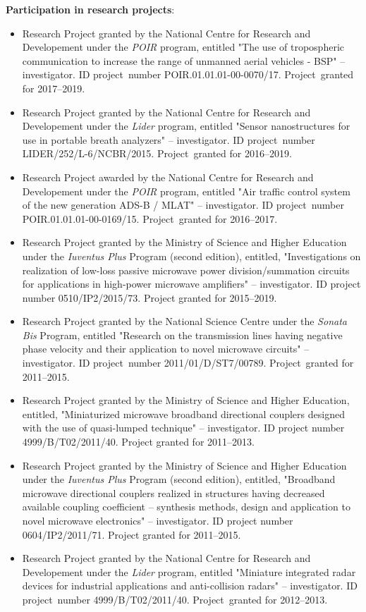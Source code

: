 \noindent \textbf{Participation in research projects}:
\begin{itemize}[nosep]
\item Research Project granted by the National Centre for Research and Developement under the \textit{POIR} program, entitled "The use of tropospheric communication to increase the range of unmanned aerial vehicles - BSP" -- investigator. ID project~number POIR.01.01.01-00-0070/17. Project~granted for 2017--2019.
\item Research Project granted by the National Centre for Research and Developement under the \textit{Lider} program, entitled "Sensor nanostructures for use in portable breath analyzers" -- investigator. ID project~number LIDER/252/L-6/NCBR/2015. Project~granted for 2016--2019.
\item Research Project awarded by the National Centre for Research and Developement under the \textit{POIR} program, entitled "Air traffic control system of the new generation ADS-B / MLAT" -- investigator. ID project~number POIR.01.01.01-00-0169/15. Project~granted for 2016--2017.
\item Research Project granted by the Ministry of Science and Higher Education under the \textit{Iuventus Plus} Program (second edition), entitled, "Investigations on realization of low-loss passive microwave power division/summation circuits for applications in high-power microwave amplifiers" -- investigator. ID project number 0510/IP2/2015/73. Project granted for 2015--2019.
\item Research Project granted by the National Science Centre under the \textit{Sonata Bis} Program, entitled "Research on the transmission lines having negative phase velocity and their application to novel microwave circuits" -- investigator. ID project~number 2011/01/D/ST7/00789. Project~granted for 2011--2015.
\item Research Project granted by the Ministry of Science and Higher Education, entitled, "Miniaturized microwave broadband directional couplers designed with the use of quasi-lumped technique" -- investigator. ID project number 4999/B/T02/2011/40. Project granted for 2011--2013.
\item Research Project granted by the Ministry of Science and Higher Education under the \textit{Iuventus Plus} Program (second edition), entitled, "Broadband microwave directional couplers realized in structures having decreased available coupling coefficient -- synthesis methods, design and application to novel microwave electronics" -- investigator. ID project number 0604/IP2/2011/71. Project granted for 2011--2015.
\item Research Project granted by the National Centre for Research and Developement under the \textit{Lider} program, entitled "Miniature integrated radar devices for industrial applications and anti-collision radars" -- investigator. ID project~number 4999/B/T02/2011/40. Project~granted for 2012--2013.
\end{itemize}
\vspace*{1cm} %

